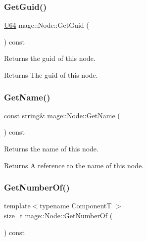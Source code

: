 \subsubsection{\texorpdfstring{Get\+Guid()}{GetGuid()}}
{\footnotesize\ttfamily \mbox{\hyperlink{namespacemage_a6672cf3c861707ce4a3235a3eb43941d}{U64}} mage\+::\+Node\+::\+Get\+Guid (\begin{DoxyParamCaption}{ }\end{DoxyParamCaption}) const\hspace{0.3cm}{\ttfamily [noexcept]}}

Returns the guid of this node.

\begin{DoxyReturn}{Returns}
The guid of this node. 
\end{DoxyReturn}
\mbox{\label{classmage_1_1_node_a206e7c7ef80a0561b31ebbb9d05c98a0}} 
\subsubsection{\texorpdfstring{Get\+Name()}{GetName()}}
{\footnotesize\ttfamily const string\& mage\+::\+Node\+::\+Get\+Name (\begin{DoxyParamCaption}{ }\end{DoxyParamCaption}) const\hspace{0.3cm}{\ttfamily [noexcept]}}

Returns the name of this node.

\begin{DoxyReturn}{Returns}
A reference to the name of this node. 
\end{DoxyReturn}
\mbox{\label{classmage_1_1_node_a0cd486de1639d5af2618ba913124fbe6}} 
\subsubsection{\texorpdfstring{Get\+Number\+Of()}{GetNumberOf()}}
{\footnotesize\ttfamily template$<$typename ComponentT $>$ \\
size\+\_\+t mage\+::\+Node\+::\+Get\+Number\+Of (\begin{DoxyParamCaption}{ }\end{DoxyParamCaption}) const\hspace{0.3cm}{\ttfamily [noexcept]}}


